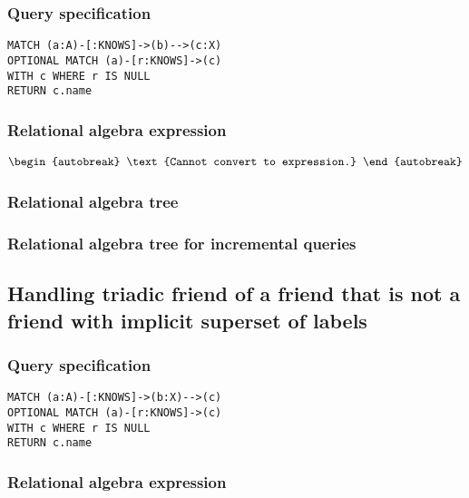 \subsubsection*{Query specification}

\begin{lstlisting}
MATCH (a:A)-[:KNOWS]->(b)-->(c:X)
OPTIONAL MATCH (a)-[r:KNOWS]->(c)
WITH c WHERE r IS NULL
RETURN c.name
\end{lstlisting}

\subsubsection*{Relational algebra expression}

\begin{align*}
\begin{autobreak}
\text{Cannot convert to expression.}
\end{autobreak}
\end{align*}

\subsubsection*{Relational algebra tree}


\subsubsection*{Relational algebra tree for incremental queries}


\subsection{Handling triadic friend of a friend that is not a friend with implicit superset of labels}

\subsubsection*{Query specification}

\begin{lstlisting}
MATCH (a:A)-[:KNOWS]->(b:X)-->(c)
OPTIONAL MATCH (a)-[r:KNOWS]->(c)
WITH c WHERE r IS NULL
RETURN c.name
\end{lstlisting}

\subsubsection*{Relational algebra expression}

